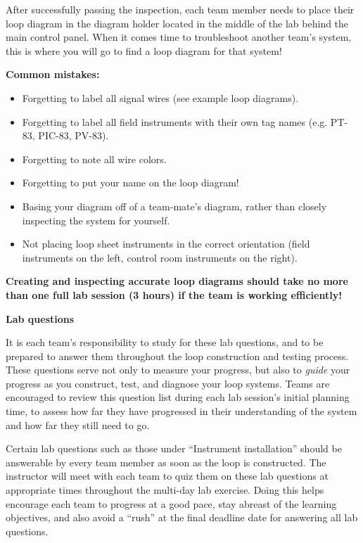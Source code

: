 After successfully passing the inspection, each team member needs to place their loop diagram in the diagram holder located in the middle of the lab behind the main control panel.  When it comes time to troubleshoot another team's system, this is where you will go to find a loop diagram for that system!

\vskip 10pt

{\bf Common mistakes:}

\begin{itemize}
\item{} Forgetting to label all signal wires (see example loop diagrams).
\item{} Forgetting to label all field instruments with their own tag names (e.g. PT-83, PIC-83, PV-83).
\item{} Forgetting to note all wire colors.
\item{} Forgetting to put your name on the loop diagram!
\item{} Basing your diagram off of a team-mate's diagram, rather than closely inspecting the system for yourself.
\item{} Not placing loop sheet instruments in the correct orientation (field instruments on the left, control room instruments on the right).
\end{itemize}

\vskip 10pt

{\bf Creating and inspecting accurate loop diagrams should take no more than one full lab session (3 hours) if the team is working efficiently!}









\vfil \eject

\noindent
{\bf Lab questions}

\vskip 5pt

It is each team's responsibility to study for these lab questions, and to be prepared to answer them throughout the loop construction and testing process.  These questions serve not only to measure your progress, but also to {\it guide} your progress as you construct, test, and diagnose your loop systems.  Teams are encouraged to review this question list during each lab session's initial planning time, to assess how far they have progressed in their understanding of the system and how far they still need to go.

Certain lab questions such as those under ``Instrument installation'' should be answerable by every team member as soon as the loop is constructed.  The instructor will meet with each team to quiz them on these lab questions at appropriate times throughout the multi-day lab exercise.  Doing this helps encourage each team to progress at a good pace, stay abreast of the learning objectives, and also avoid a ``rush'' at the final deadline date for answering all lab questions.

